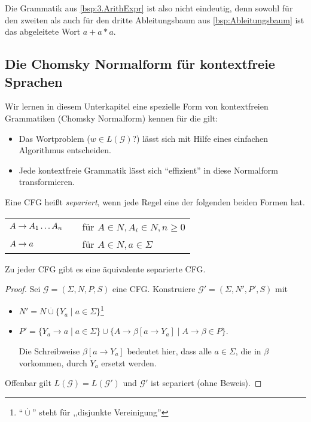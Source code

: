 Die Grammatik aus \autoref{bsp:3.ArithExpr} ist also nicht eindeutig, denn sowohl für den zweiten als auch für den dritte Ableitungsbaum aus \autoref{bsp:Ableitungsbaum} ist das abgeleitete Wort $a+a*a$.



\subsection{Die Chomsky Normalform für kontextfreie Sprachen}
Wir lernen in diesem Unterkapitel eine spezielle Form von kontextfreien Grammatiken (Chomsky Normalform) kennen für die gilt:
\begin{itemize}
 \item Das Wortproblem ($w\in L(\mathcal{G})$?) lässt sich mit Hilfe eines einfachen Algorithmus entscheiden.
 \item Jede kontextfreie Grammatik lässt sich ``effizient'' in diese Normalform transformieren.
\end{itemize}


\begin{Def}
  Eine CFG heißt \emph{separiert}, wenn jede Regel eine der folgenden beiden Formen hat.
  \begin{center}
  \begin{tabular}{ll}
   $A\-> A_1\dots A_n$ & \ \ für $A\in N, A_i\in N,n\geq 0$\\[1mm]
   $A \-> a$ & \ \ für $A\in N, a\in\Sigma$
  \end{tabular}
  \end{center}
\end{Def}

\begin{lemma}
  Zu jeder CFG gibt es eine äquivalente separierte CFG.
\end{lemma}
\begin{proof}
  Sei $\mathcal{G} = (\Sigma, N, P, S)$ eine CFG.
  Konstruiere $\mathcal{G}' = (\Sigma, N', P', S)$ mit
  \begin{itemize}
  \item $N' = N \overset.\cup \{Y_a \mid a \in \Sigma \}$\footnote{``$\overset.\cup$'' steht für ,,disjunkte Vereinigung''}
  \item $P' = \{Y_a \to a \mid a \in \Sigma \} \cup \{A \to \beta[a \to Y_a] \mid A \to \beta \in P \}$.
  
    Die Schreibweise $\beta[a\to Y_a]$ bedeutet hier, dass alle $a \in \Sigma$, die in $\beta$ vorkommen, durch $Y_a$ ersetzt werden.
  \end{itemize}
  Offenbar gilt $L(\mathcal{G}) = L(\mathcal{G'})$ und $\mathcal{G}'$ ist separiert (ohne Beweis).
\end{proof}

